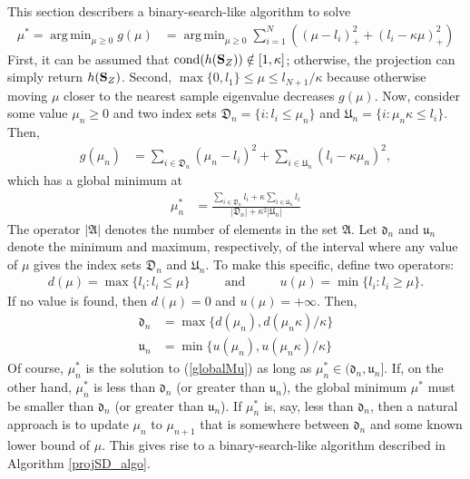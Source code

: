 \documentclass[11pt]{article}
\DeclareMathOperator*{\argmin}{arg\,min}
\theoremstyle{definition}
\theoremstyle{definition}
\def\SS{{\bf S}}
\def\cond{\text{cond}}
\begin{document}
This section describers a binary-search-like algorithm to solve
\begin{align}
\mu^* = \argmin_{\mu \geq 0 }g(\mu) &=\argmin_{\mu \geq 0 }\sum_{i=1}^{N} \left( \left(\mu-l_i\right)^2_+ + \left(l_i - \kappa\mu\right)^2_+ \right) \label{globalMu}
\end{align}
First, it can be assumed that $\cond(h(\SS_Z)) \notin [1,\kappa]$; otherwise, the projection can simply return $h(\SS_Z)$. Second, $\max\{0, l_1\} \leq \mu \leq l_{N+1}/\kappa$ because otherwise moving $\mu$ closer to the nearest sample eigenvalue decreases $g(\mu)$. Now, consider some value $\mu_n \geq 0$ and two index sets $\mathfrak{D}_n = \{i : l_i \leq \mu_n\}$ and $\mathfrak{U}_n = \{i : \mu_n\kappa \leq  l_i \}$. Then,
\begin{align*}
g(\mu_n) &= \sum_{i \in \mathfrak{D}_n}  \left(\mu_n-l_i\right)^2  + \sum_{i \in \mathfrak{U}_n} \left(l_i - \kappa\mu_n\right)^2,
\end{align*}
 which has a global minimum at 
\begin{align*}
\mu_n^* &= \frac{\sum_{i \in \mathfrak{D}_n} l_i  + \kappa \sum_{i \in \mathfrak{U}_n} l_i }{|\mathfrak{D}_n | + \kappa^2 |\mathfrak{U}_n|}
\end{align*}
 The operator $|\mathfrak{A}|$ denotes the number of elements in the set $\mathfrak{A}$.  Let $\mathfrak{d}_n$ and $\mathfrak{u}_n$ denote the minimum and maximum, respectively, of the interval where any value of $\mu$ gives the index sets $\mathfrak{D}_n$ and $\mathfrak{U}_n$. To make this specific, define two operators:
 \begin{align*}
 d(\mu) = \max\{l_i : l_i \leq \mu\} &&& \text{ and } &&& u(\mu) = \min\{l_i : l_i \geq \mu\}.
\end{align*} 
If no value is found, then $d(\mu) = 0$ and $u(\mu) = +\infty$.  Then, 
 \begin{align*}
\mathfrak{d}_n &= \max \{d(\mu_n), d(\mu_n\kappa)/\kappa\}\\
\mathfrak{u}_n &= \min \{u(\mu_n), u(\mu_n\kappa)/\kappa\}
\end{align*}
 Of course, $\mu^*_n$ is the solution to (\ref{globalMu}) as long as $\mu_n^* \in (\mathfrak{d}_n, \mathfrak{u}_n]$. If, on the other hand, $\mu_n^*$ is less than $\mathfrak{d}_n$ (or greater than $\mathfrak{u}_n$), the global minimum $\mu^*$ must be smaller than $\mathfrak{d}_n$ (or greater than $\mathfrak{u}_n$). If $\mu_n^*$ is, say, less than $\mathfrak{d}_n$, then a natural approach is to update $\mu_n$ to $\mu_{n+1}$ that is somewhere between $\mathfrak{d}_n$ and some known lower bound of $\mu$.  This gives rise to a binary-search-like algorithm described in Algorithm \ref{projSD_algo}. 
 
\end{document}
